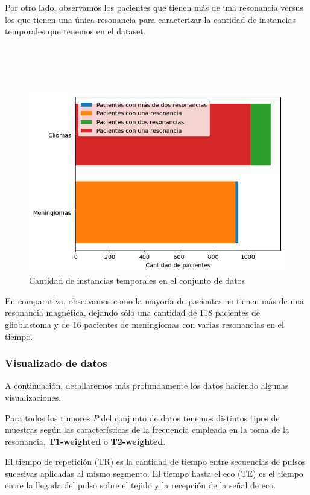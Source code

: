 Por otro lado, observamos los pacientes que tienen más de una resonancia versus los que tienen una única resonancia para caracterizar la cantidad de instancias temporales que tenemos en el dataset.
\\
\\
\\
\\
\\

\begin{figure}[!h]
	\centering
	\includegraphics[width=0.8\linewidth]{imagenes/cantidadinstanciastemporales.png}
	\caption{Cantidad de instancias temporales en el conjunto de datos}
\end{figure}

En comparativa, observamos como la mayoría de pacientes no tienen más de una resonancia magnética, dejando sólo una cantidad de $118$ pacientes de glioblastoma y de $16$ pacientes de meningiomas con varias resonancias en el tiempo.

\subsubsection{Visualizado de datos}

A continuación, detallaremos más profundamente los datos haciendo algunas visualizaciones. 

Para todos los tumores $P$ del conjunto de datos tenemos distintos tipos de muestras según las características de la frecuencia empleada en la toma de la resonancia, \textbf{T1-weighted} o \textbf{T2-weighted}. \cite{labella2023asnrmiccai}

El tiempo de repetición (TR) es la cantidad de tiempo entre secuencias de pulsos sucesivas aplicadas al mismo segmento. El tiempo hasta el eco (TE) es el tiempo entre la llegada del pulso sobre el tejido y la recepción de la señal de eco.

